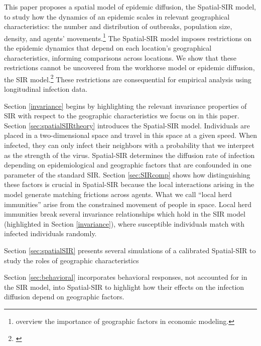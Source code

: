 \documentclass[english,11pt]{article}
\begin{document}
This paper proposes a spatial model of epidemic diffusion, the Spatial-SIR model, to study how the dynamics of an epidemic scales in relevant geographical characteristics: the number and distribution of outbreaks, population size, density, and agents' movements.\footnote{
    \cite{duranton-puga} overview the importance of geographic factors in economic modeling.
    }
The Spatial-SIR model imposes restrictions on the epidemic dynamics that depend on each location's geographical characteristics, informing comparisons across locations. We show that these restrictions cannot be uncovered from 
the workhorse model or epidemic diffusion, the SIR model.\footnote{\cite{kermack1927contribution, kermack1932contributions}} These restrictions are consequential
for empirical analysis using longitudinal infection data. 

Section \ref{invariance} begins by highlighting the relevant invariance properties of SIR with respect to the geographic characteristics we focus on in this paper. Section \ref{sec:spatialSIRtheory}  introduces the Spatial-SIR model. Individuals
are placed in a two-dimensional
space and travel in this space at a given speed. When infected, they
can only infect their neighbors with a probability that we
interpret as the strength of the virus. 
Spatial-SIR determines the diffusion rate of infection 
depending on epidemiological and geographic factors that are 
confounded in one parameter of the standard SIR.
Section \ref{sec:SIRcomp} shows how distinguishing these factors is crucial in Spatial-SIR because the local interactions arising in the model generate matching frictions across agents. What we
call ``local herd 
immunities'' arise from the constrained movement of people
in space. Local herd immunities break several  invariance relationships which hold in the SIR model (highlighted in Section  \ref{invariance}), where
susceptible individuals match with infected individuals randomly.

Section \ref{sec:spatialSIR} presents several simulations of a calibrated  Spatial-SIR to study the roles of geographic characteristics  %

Section \ref{sec:behavioral} incorporates behavioral responses, not accounted for in the SIR model, into Spatial-SIR to highlight how their effects on the infection diffusion depend on geographic factors. 
\end{document}
